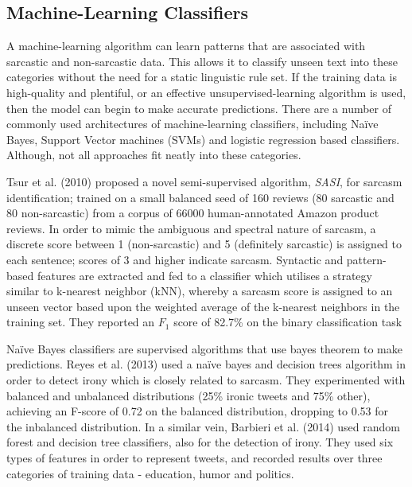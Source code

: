 \documentclass[12pt,a4paper]{article}
\begin{document}
\subsection{Machine-Learning Classifiers}
\noindent A machine-learning algorithm can learn patterns that are associated with sarcastic and non-sarcastic data. This allows it to classify unseen text into these categories without the need for a static linguistic rule set. If the training data is high-quality and plentiful, or an effective unsupervised-learning algorithm is used, then the model can begin to make accurate predictions. There are a number of commonly used architectures of machine-learning classifiers, including Na\"{i}ve Bayes, Support Vector machines (SVMs) and logistic regression based classifiers. Although, not all approaches fit neatly into these categories.

Tsur et al. (2010) \cite{tsur2010icwsm} proposed a novel semi-supervised algorithm, \textit{SASI}, for sarcasm identification; trained on a small balanced seed of 160 reviews (80 sarcastic and 80 non-sarcastic) from a corpus of 66000 human-annotated Amazon product reviews. In order to mimic the ambiguous and spectral nature of sarcasm, a discrete score between 1 (non-sarcastic) and 5 (definitely sarcastic) is assigned to each sentence; scores of 3 and higher indicate sarcasm. Syntactic and pattern-based features are extracted and fed to a classifier which utilises a strategy similar to k-nearest neighbor (kNN), whereby a sarcasm score is assigned to an unseen vector based upon the weighted average of the k-nearest neighbors in the training set. They reported an $F_{1}$ score of 82.7\% on the binary classification task

Na\"{i}ve Bayes classifiers are supervised algorithms that use bayes theorem to make predictions. Reyes et al. (2013) \cite{reyes2013multidimensional} used a na\"{i}ve bayes and decision trees algorithm in order to detect irony which is closely related to sarcasm. They experimented with balanced and unbalanced distributions (25\% ironic tweets and 75\% other), achieving an F-score of 0.72 on the balanced distribution, dropping to 0.53 for the inbalanced distribution. In a similar vein, Barbieri et al. (2014) \cite{barbieri2014modelling} used random forest and decision tree classifiers, also for the detection of irony. They used six types of features in order to represent tweets, and recorded results over three categories of training data - education, humor and politics.
\end{document}
